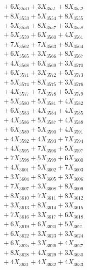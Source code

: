 \documentclass[a4paper,10pt]{article}
\begin{document}
{\begin{align}
&\;  + 6 X_{3550} + 3 X_{3551} + 8 X_{3552} \\[0.3ex]
&\;  + 8 X_{3553} + 5 X_{3554} + 8 X_{3555} \\[0.3ex]
&\;  + 5 X_{3556} + 8 X_{3557} + 3 X_{3558} \\[0.3ex]
&\;  + 5 X_{3559} + 6 X_{3560} + 4 X_{3561} \\[0.3ex]
&\;  + 7 X_{3562} + 7 X_{3563} + 8 X_{3564} \\[0.3ex]
&\;  + 6 X_{3565} + 3 X_{3566} + 8 X_{3567} \\[0.3ex]
&\;  + 4 X_{3568} + 6 X_{3569} + 3 X_{3570} \\[0.3ex]
&\;  + 6 X_{3571} + 3 X_{3572} + 5 X_{3573} \\[0.3ex]
&\;  + 5 X_{3574} + 8 X_{3575} + 3 X_{3576} \\[0.3ex]
&\;  + 4 X_{3577} + 7 X_{3578} + 5 X_{3579} \\[0.5ex]\allowbreak
&\;  + 5 X_{3580} + 5 X_{3581} + 4 X_{3582} \\[0.3ex]
&\;  + 6 X_{3583} + 4 X_{3584} + 4 X_{3585} \\[0.3ex]
&\;  + 4 X_{3586} + 5 X_{3587} + 4 X_{3588} \\[0.3ex]
&\;  + 6 X_{3589} + 5 X_{3590} + 4 X_{3591} \\[0.3ex]
&\;  + 4 X_{3592} + 4 X_{3593} + 7 X_{3594} \\[0.3ex]
&\;  + 4 X_{3595} + 7 X_{3596} + 5 X_{3597} \\[0.3ex]
&\;  + 7 X_{3598} + 5 X_{3599} + 6 X_{3600} \\[0.3ex]
&\;  + 4 X_{3601} + 5 X_{3602} + 7 X_{3603} \\[0.3ex]
&\;  + 3 X_{3604} + 8 X_{3605} + 3 X_{3606} \\[0.3ex]
&\;  + 7 X_{3607} + 3 X_{3608} + 8 X_{3609} \\[0.5ex]\allowbreak
&\;  + 8 X_{3610} + 7 X_{3611} + 8 X_{3612} \\[0.3ex]
&\;  + 3 X_{3613} + 8 X_{3614} + 3 X_{3615} \\[0.3ex]
&\;  + 7 X_{3616} + 3 X_{3617} + 6 X_{3618} \\[0.3ex]
&\;  + 6 X_{3619} + 6 X_{3620} + 5 X_{3621} \\[0.3ex]
&\;  + 6 X_{3622} + 3 X_{3623} + 3 X_{3624} \\[0.3ex]
&\;  + 6 X_{3625} + 3 X_{3626} + 4 X_{3627} \\[0.3ex]
&\;  + 8 X_{3628} + 4 X_{3629} + 3 X_{3630} \\[0.3ex]
&\;  + 4 X_{3631} + 4 X_{3632} + 4 X_{3633} \\[0.3ex]

\end{align}}
\end{document}
